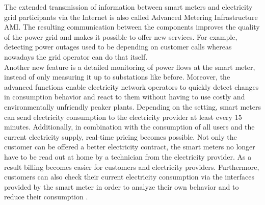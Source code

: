 The extended transmission of information between smart meters and electricity grid participants via the Internet is also called Advanced Metering Infrastructure \gls{AMI}. The resulting communication between the components improves the quality of the power grid and makes it possible to offer new services. For example, detecting power outages used to be depending on customer calls whereas nowadays the grid operator can do that itself.\\
Another new feature is a detailed monitoring of power flows at the smart meter, instead of only measuring it up to substations like before. Moreover, the advanced functions enable electricity network operators to quickly detect changes in consumption behavior and react to them without having to use costly and environmentally unfriendly peaker plants. Depending on the setting, smart meters can send electricity consumption to the electricity provider at least every 15 minutes. Additionally, in combination with the consumption of all users and the current electricity supply, real-time pricing becomes possible. Not only the customer can be offered a better electricity contract, the smart meters no longer have to be read out at home by a technician from the electricity provider. As a result billing becomes easier for customers and electricity providers. Furthermore, customers can also check their current electricity consumption via the interfaces provided by the smart meter in order to analyze their own behavior and to reduce their consumption \cite{finster2014privacy}. 
